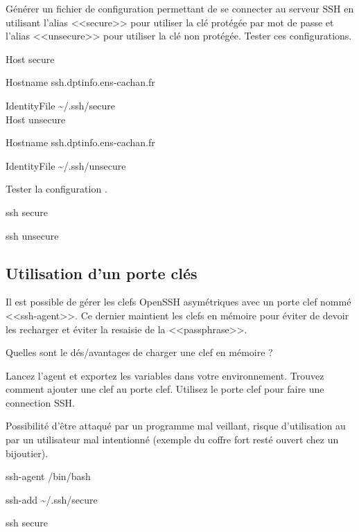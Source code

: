 \documentclass[11pt]{article}
\begin{document}
Générer un fichier de configuration permettant de se connecter au serveur SSH en utilisant l'alias <<secure>> pour utiliser la clé protégée par mot de passe et l'alias <<unsecure>> pour utiliser la clé non protégée. Tester ces configurations.

\begin{solution}

Host secure

Hostname ssh.dptinfo.ens-cachan.fr

IdentityFile \textasciitilde{}/.ssh/secure
\\

Host unsecure

Hostname ssh.dptinfo.ens-cachan.fr

IdentityFile \textasciitilde{}/.ssh/unsecure

\end{solution}

Tester la configuration .

\begin{solution}

ssh secure

ssh unsecure
\end{solution}

\subsection{Utilisation d'un porte clés}

Il est possible de gérer les clefs OpenSSH asymétriques avec un porte clef nommé <<ssh-agent>>. Ce dernier maintient les clefs en mémoire pour éviter de devoir les recharger et éviter la resaisie de la <<passphrase>>.

Quelles sont le dés/avantages de charger une clef en mémoire ?

Lancez l’agent et exportez les variables dans votre environnement. Trouvez comment ajouter une clef au porte clef. Utilisez le porte clef pour faire une connection SSH.

\begin{solution}

Possibilité d'être attaqué par un programme mal veillant, risque d'utilisation au par un utilisateur mal intentionné (exemple du coffre fort resté ouvert chez un bijoutier).

ssh-agent /bin/bash

ssh-add \textasciitilde{}/.ssh/secure

ssh secure

\end{solution}
\end{document}
